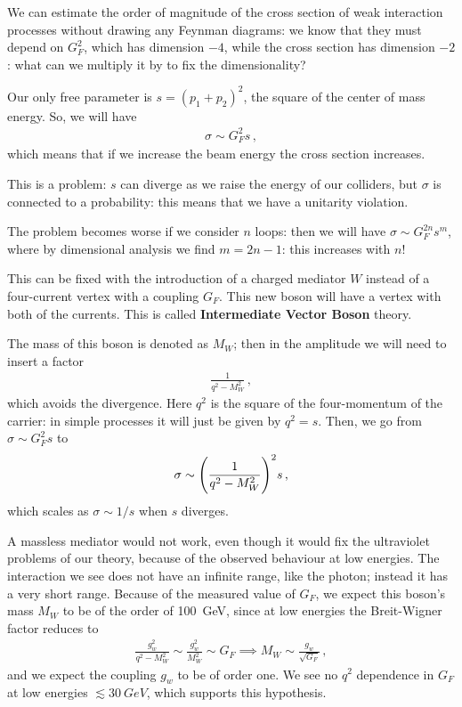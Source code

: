 \documentclass[main.tex]{subfiles}
\begin{document}
We can estimate the order of magnitude of the cross section of weak interaction processes without drawing any Feynman diagrams: we know that they must depend on \(G_F^2\), which has dimension \(-4\), while the cross section has dimension \(-2\): what can we multiply it by to fix the dimensionality?

Our only free parameter is \(s = (p_1 + p_2 )^2\), the square of the center of mass energy. So, we will have 
%
\begin{align}
\sigma \sim G_F^2 s
\,,
\end{align}
%
which means that if we increase the beam energy the cross section increases. 

This is a problem: \(s\) can diverge as we raise the energy of our colliders, but \(\sigma \) is connected to a probability: this means that we have a unitarity violation. 

The problem becomes worse if we consider \(n\) loops: then we will have \(\sigma \sim G_F^{2n} s^{m}\), where by dimensional analysis we find \(m = 2n-1\): this increases with \(n\)!

This can be fixed with the introduction of a charged mediator \(W\) instead of a four-current vertex with a coupling \(G_F\).
This new boson will have a vertex with both of the currents. 
This is called \textbf{Intermediate Vector Boson} theory. 

The mass of this boson is denoted as \(M_W\); then in the amplitude we will need to insert a factor 
%
\begin{align}
\frac{1}{q^2- M_W^2}
\,,
\end{align}
%
which avoids the divergence. Here \(q^2\) is the square of the four-momentum of the carrier: in simple processes it will just be given by \(q^2 = s\). 
Then, we go from \(\sigma \sim G_F^2s\) to 
%
\begin{align}
\sigma \sim \qty( \frac{1}{q^2 - M_W^2})^2 s 
\,,
\end{align}
%
which scales as \(\sigma \sim 1 / s\) when \(s\) diverges.

A massless mediator would not work, even though it would fix the ultraviolet problems of our theory, because of the observed behaviour at low energies.
The interaction we see does not have an infinite range, like the photon; instead it has a very short range. 
Because of the measured value of \(G_F\), we expect this boson's mass \(M_W\) to be of the order of \SI{100}{GeV}, since at low energies the Breit-Wigner factor reduces to 
%
\begin{align}
\frac{g_w^2}{q^2 - M_W^2} \sim \frac{g_w^2}{M_W^2} \sim G_F
\implies M_W \sim \frac{g_w}{\sqrt{G_F}}
\,,
\end{align}
%
and we expect the coupling \(g_w\) to be of order one. 
We see no \(q^2\) dependence in \(G_F\) at low energies \(\lesssim \SI{30}{GeV}\), which supports this hypothesis.
\end{document}
